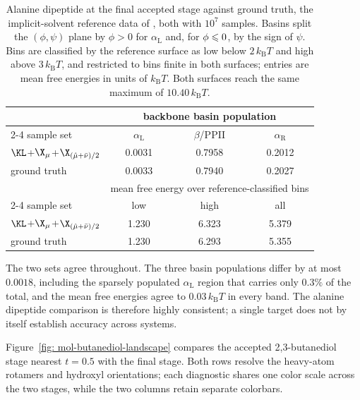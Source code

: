 \documentclass{article}
\begin{document}
\begin{table}[htb]
\centering
\small
\begin{tabular}{lccc}
\toprule
& \multicolumn{3}{c}{backbone basin population} \\
\cmidrule(l){2-4}
sample set & \(\alpha_{\mathrm L}\) & \(\beta\)/PPII & \(\alpha_{\mathrm R}\) \\
\midrule
$\KL$+$\X_\mu$+$\X_{(\hat\mu+\bar\nu)/2}$ & 0.0031 & 0.7958 & 0.2012 \\
ground truth & 0.0033 & 0.7940 & 0.2027 \\
\midrule
& \multicolumn{3}{c}{mean free energy over reference-classified bins} \\
\cmidrule(l){2-4}
sample set & low & high & all \\
\midrule
$\KL$+$\X_\mu$+$\X_{(\hat\mu+\bar\nu)/2}$ & 1.230 & 6.323 & 5.379 \\
ground truth & 1.230 & 6.293 & 5.355 \\
\bottomrule
\end{tabular}
\caption{Alanine dipeptide at the final accepted stage against ground truth, the implicit-solvent reference data of \citet{midgley2022flow}, both with \(10^7\) samples. Basins split the \((\phi,\psi)\) plane by \(\phi>0\) for \(\alpha_{\mathrm L}\) and, for \(\phi\leqslant0\), by the sign of \(\psi\). Bins are classified by the reference surface as low below \(2\,k_{\mathrm B}T\) and high above \(3\,k_{\mathrm B}T\), and restricted to bins finite in both surfaces; entries are mean free energies in units of \(k_{\mathrm B}T\). Both surfaces reach the same maximum of \(10.40\,k_{\mathrm B}T\).}
\label{tab: mol-adp-reference}
\end{table}

The two sets agree throughout. The three basin populations differ by at most \(0.0018\), including the sparsely populated \(\alpha_{\mathrm L}\) region that carries only \(0.3\%\) of the total, and the mean free energies agree to \(0.03\,k_{\mathrm B}T\) in every band. The alanine dipeptide comparison is therefore highly consistent; a single target does not by itself establish accuracy across systems.

Figure~\ref{fig: mol-butanediol-landscape} compares the accepted 2,3-butanediol stage nearest \(t=0.5\) with the final stage. Both rows resolve the heavy-atom rotamers and hydroxyl orientations; each diagnostic shares one color scale across the two stages, while the two columns retain separate colorbars.
\end{document}
